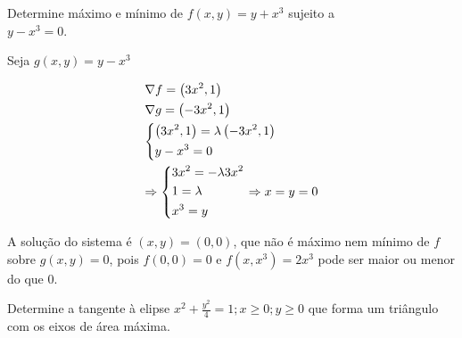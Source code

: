 \documentclass[11pt, oneside, a4paper]{gsm-l}
\begin{document}
\begin{exem}
    Determine máximo e mínimo de $f\left( {x,y} \right) = y + x^3$ sujeito a \\ $y - x^3  = 0$.
\end{exem}

\begin{sol}
Seja $g\left( {x,y} \right) = y - x^3$

\[
\begin{gathered}
\nabla f = \left( {3x^2 ,1} \right) \hfill \\
\nabla g = \left( { - 3x^2 ,1} \right) \hfill \\
\left\{ \begin{gathered}
\left( {3x^2 ,1} \right) = \lambda \left( { - 3x^2 ,1} \right) \hfill \\
y - x^3  = 0 \hfill \\
\end{gathered}  \right. \hfill \\
\Rightarrow \left\{ \begin{gathered}
3x^2  =  - \lambda 3x^2  \hfill \\
1 = \lambda  \hfill \\
x^3  = y \hfill \\
\end{gathered}  \right. \Rightarrow x = y = 0 \hfill \\
\end{gathered}
\]

    A solução do sistema é $\left( {x,y} \right) = \left( {0,0} \right)$, que não é máximo nem mínimo de $f$ sobre $g\left( {x,y} \right) = 0$, pois $f\left( {0,0} \right) = 0$ e $f\left( {x,x^3 } \right) = 2x^3$ pode ser maior ou menor do que $0$.
\end{sol}

\begin{exem}
Determine a tangente \`a elipse $x^2  + \frac{{y^2 }}
{4} = 1;x \geqslant 0;y \geqslant 0$ que forma um tri\^angulo com os eixos de área máxima.
\end{exem}
\end{document}

